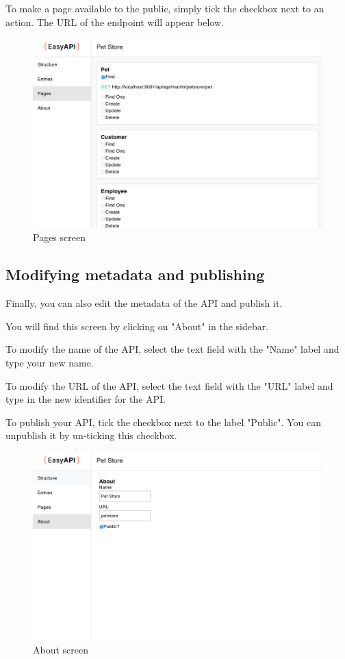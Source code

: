 To make a page available to the public, simply tick the checkbox next to an action. The URL of the endpoint will appear below.

\begin{figure}
\label{pagesimg}
\centerline{\includegraphics[scale=0.4]{screenshots/pages.png}}
\caption{Pages screen}
\end{figure}

\subsection{Modifying metadata and publishing}
Finally, you can also edit the metadata of the API and publish it.

You will find this screen by clicking on "About" in the sidebar.

To modify the name of the API, select the text field with the "Name" label and type your new name.

To modify the URL of the API, select the text field with the "URL" label and type in the new identifier for the API.

To publish your API, tick the checkbox next to the label "Public". You can unpublish it by un-ticking this checkbox.

\begin{figure}
\label{aboutimg}
\centerline{\includegraphics[scale=0.4]{screenshots/about.png}}
\caption{About screen}
\end{figure}

